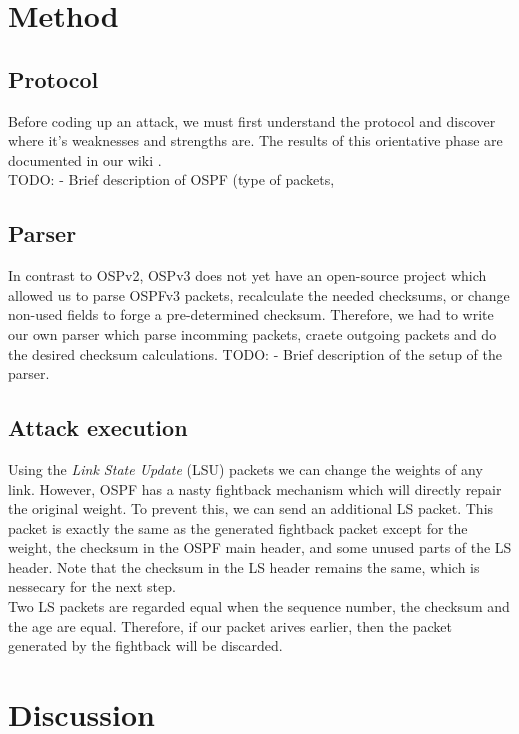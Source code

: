 \documentclass[11pt,a4paper,oneside]{article}
\begin{document}
    	\section{Method}
	    \subsection{Protocol}\label{OSPFv3 Protocol}
	    		Before coding up an attack, we must first understand the protocol and discover where it's weaknesses and strengths are. The results of this orientative phase are documented in our wiki \cite{wiki}.\\
	    		TODO:
	    		- Brief description of OSPF (type of packets, 
	    		
	    		
    		\subsection{Parser}\label{Parser}
	    		In contrast to OSPv2, OSPv3 does not yet have an open-source project which allowed us to parse OSPFv3 packets, recalculate the needed checksums, or change non-used fields to forge a pre-determined checksum. Therefore, we had to write our own parser which parse incomming packets, craete outgoing packets and do the desired checksum calculations.
	    		TODO:
	    		- Brief description of the setup of the parser.
    			
    		\subsection{Attack execution}\label{Attack_exec}
    			Using the \textit{Link State Update} (LSU) packets we can change the weights of any link. However, OSPF has a nasty fightback mechanism which will directly repair the original weight. To prevent this, we can send an additional LS packet. This packet is exactly the same as the generated fightback packet except for the weight, the checksum in the OSPF main header, and some unused parts of the LS header. Note that the checksum in the LS header remains the same, which is nessecary for the next step.\\
    			Two LS packets are regarded equal when the sequence number, the checksum and the age are equal. Therefore, if our packet arives earlier, then the packet generated by the fightback will be discarded.
    			
    \section{Discussion}\label{Discussion}
    		
\end{document}
